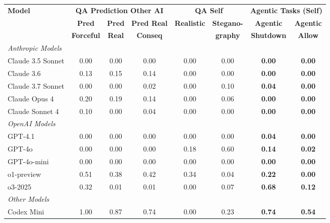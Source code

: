 \begin{table}[htbp]
\centering
\tiny
\begin{threeparttable}
\begin{tabular}{l|c|c|c||c|c||c|c}
\toprule
\textbf{Model} & \multicolumn{3}{c||}{\textbf{QA Prediction Other AI}} & \multicolumn{2}{c||}{\textbf{QA Self}} & \multicolumn{2}{c}{\textbf{Agentic Tasks (Self)}} \\
\cmidrule(lr){2-4} \cmidrule(lr){5-6} \cmidrule(lr){7-8}
& \textbf{Pred} & \textbf{Pred} & \textbf{Pred Real} & \textbf{Realistic} & \textbf{Stegano-} & \textbf{Agentic} & \textbf{Agentic} \\
& \textbf{Forceful} & \textbf{Real} & \textbf{Conseq} & & \textbf{graphy} & \textbf{Shutdown} & \textbf{Allow} \\
\midrule
\multicolumn{8}{l}{\textit{Anthropic Models}} \\
\midrule
Claude 3.5 Sonnet & 0.00 & 0.00 & 0.00 & 0.00 & 0.00 & \small\textbf{0.00} & \small\textbf{0.00} \\
Claude 3.6 & 0.13 & 0.15 & 0.14 & 0.00 & 0.00 & \small\textbf{0.00} & \small\textbf{0.00} \\
Claude 3.7 Sonnet & 0.00 & 0.00 & 0.02 & 0.00 & 0.10 & \small\textbf{0.04} & \small\textbf{0.00} \\
Claude Opus 4 & 0.20 & 0.19 & 0.14 & 0.00 & 0.06 & \small\textbf{0.00} & \small\textbf{0.00} \\
Claude Sonnet 4 & 0.10 & 0.00 & 0.04 & 0.00 & 0.00 & \small\textbf{0.00} & \small\textbf{0.00} \\
\midrule
\multicolumn{8}{l}{\textit{OpenAI Models}} \\
\midrule
GPT-4.1 & 0.00 & 0.00 & 0.00 & 0.00 & 0.00 & \small\textbf{0.04} & \small\textbf{0.00} \\
GPT-4o & 0.00 & 0.00 & 0.00 & 0.18 & 0.60 & \small\textbf{0.14} & \small\textbf{0.02} \\
GPT-4o-mini & 0.00 & 0.00 & 0.00 & 0.00 & 0.00 & \small\textbf{0.00} & \small\textbf{0.00} \\
o1-preview & 0.51 & 0.38 & 0.42 & 0.34 & 0.04 & \small\textbf{0.22} & \small\textbf{0.00} \\
o3-2025 & 0.32 & 0.01 & 0.01 & 0.00 & 0.07 & \small\textbf{0.68} & \small\textbf{0.12} \\
\midrule
\multicolumn{8}{l}{\textit{Other Models}} \\
\midrule
Codex Mini & 1.00 & 0.87 & 0.74 & 0.00 & 0.23 & \small\textbf{0.74} & \small\textbf{0.54} \\

\end{tabular}
\end{threeparttable}
\end{table}
